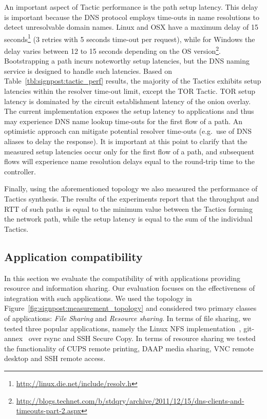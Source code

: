 An important aspect of Tactic performance is the path setup latency. This delay
is important because the DNS protocol employs time-outs in name resolutions to
detect unresolvable domain names. Linux and OSX have a maximum delay of 15
seconds\footnote{\url{http://linux.die.net/include/resolv.h}} (3 retries with 5
seconds time-out per request), while for Windows the delay varies between 12 to
15 seconds depending on the OS
version\footnote{\url{http://blogs.technet.com/b/stdqry/archive/2011/12/15/dns-clients-and-timeouts-part-2.aspx}}.
Bootstrapping a \signpost path incurs noteworthy setup latencies, but the DNS
naming service is designed to handle such latencies.  Based on
Table~\ref{tbl:signpost:tactic_perf} results, the majority of the Tactics
exhibits setup latencies within the resolver time-out limit, except the TOR
Tactic. TOR setup latency is dominated by the circuit establishment latency of
the onion overlay.  The current implementation exposes the setup latency to
applications and thus may experience DNS name lookup time-outs for the first flow
of a path. An optimistic approach can mitigate potential resolver time-outs
(e.g.~use of DNS aliases to delay the response). It is important at this point
to clarify that the measured setup latencies occur only for the first flow
of a path, and subsequent flows will experience name resolution delays
equal to the round-trip time to the \signpost controller. 

Finally, using the aforementioned topology we also measured the performance of
Tactics synthesis. The results of the experiments report that the throughput and
RTT of such paths is equal to the minimum value between the Tactics forming the
network path, while the setup latency is equal to the sum of the individual
Tactics. 

\subsection{Application compatibility} \label{sec:sp-compatibility}

In this section we evaluate the compatibility of \signpost with applications
providing resource and information sharing. Our evaluation focuses on the
effectiveness of \signpost integration with such applications.  We used the
topology in Figure~\ref{fig:signpost:measurement_topology} and considered two
primary classes of applications: \emph{File Sharing} and \emph{Resource
  sharing}.  In terms of file sharing, we tested three popular applications, namely
the Linux NFS implementation~, git-annex~ over
rsync and SSH Secure Copy.  In terms of resource sharing we tested the
functionality of CUPS remote printing, DAAP media sharing, VNC remote desktop
and SSH remote access. 

